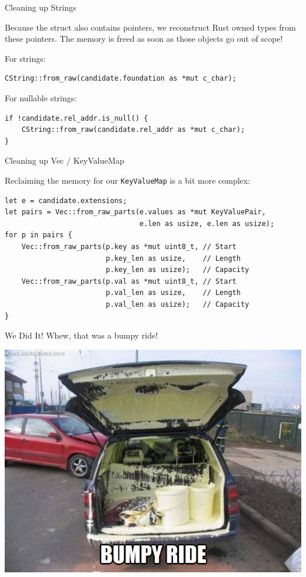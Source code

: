 \documentclass[aspectratio=1610,14pt,t]{beamer}
\begin{document}
\begin{frame}[c,fragile]{Cleaning up Strings}

  Because the struct also contains pointers, we reconstruct Rust owned types
  from these pointers. The memory is freed as soon as those objects go out of
  scope!

  For strings:

  \begin{verbatim}
CString::from_raw(candidate.foundation as *mut c_char);
  \end{verbatim}

  For nullable strings:

  \begin{verbatim}
if !candidate.rel_addr.is_null() {
    CString::from_raw(candidate.rel_addr as *mut c_char);
}
  \end{verbatim}
\end{frame}

\begin{frame}[c,fragile]{Cleaning up Vec / KeyValueMap}

  Reclaiming the memory for our \texttt{KeyValueMap} is a bit more complex:

  \begin{verbatim}
let e = candidate.extensions;
let pairs = Vec::from_raw_parts(e.values as *mut KeyValuePair,
                                e.len as usize, e.len as usize);
for p in pairs {
    Vec::from_raw_parts(p.key as *mut uint8_t, // Start
                        p.key_len as usize,    // Length
                        p.key_len as usize);   // Capacity
    Vec::from_raw_parts(p.val as *mut uint8_t, // Start
                        p.val_len as usize,    // Length
                        p.val_len as usize);   // Capacity
}
  \end{verbatim}
\end{frame}

\begin{frame}[c]{We Did It!}
  \centering
  Whew, that was a bumpy ride!

  \includegraphics[width=.6\textwidth]{img/bump.png}
\end{frame}
\end{document}
